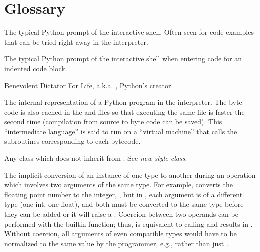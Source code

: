 \chapter{Glossary\label{glossary}}


\begin{description}


\index{>>>}
\item[\code{>\code{>}>}]
The typical Python prompt of the interactive shell.  Often seen for
code examples that can be tried right away in the interpreter.

\item[\code{.\code{.}.}]
The typical Python prompt of the interactive shell when entering code
for an indented code block.

\item[BDFL]
Benevolent Dictator For Life, a.k.a. , Python's creator.

\item[byte code]
The internal representation of a Python program in the interpreter.
The byte code is also cached in the  and 
files so that executing the same file is faster the second time
(compilation from source to byte code can be saved).  This
``intermediate language'' is said to run on a ``virtual
machine'' that calls the subroutines corresponding to each bytecode.

\item[classic class]
Any class which does not inherit from .  See
\emph{new-style class}.

\item[coercion]

The implicit conversion of an instance of one type to another during an
operation which involves two arguments of the same type.  For example,
{} converts the floating point number to the integer,
{}, but in {}, each argument is of a different type (one
int, one float), and both must be converted to the same type before they can
be added or it will raise a {}.  Coercion between two
operands can be performed with the {} builtin function; thus,
{} is equivalent to calling {} and results in {}.  Without coercion,
all arguments of even compatible types would have to be normalized to the
same value by the programmer, e.g., {} rather than just
{}.


\end{description}
